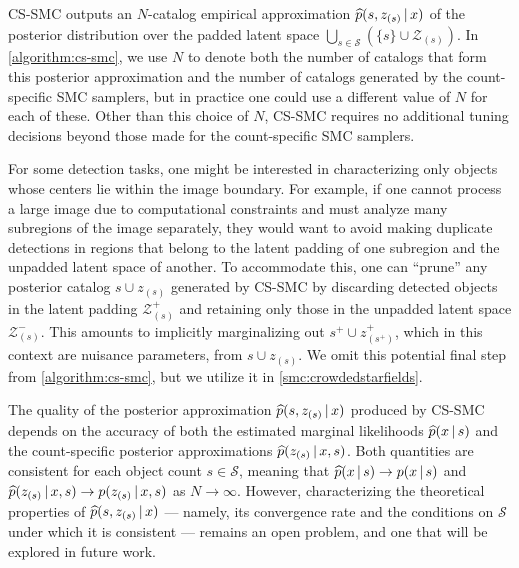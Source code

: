 \documentclass[
  12pt]{article}
\newcommand{\padvert}{\thinspace \vert \thinspace}
\begin{document}
CS-SMC outputs an $N$-catalog empirical approximation $\widehat{p}(s, z_{(s)} \padvert x)$ of the posterior distribution over the padded latent space $\bigcup_{s \in \mathcal{S}} (\{s\} \cup \mathcal{Z}_{(s)})$. In \autoref{algorithm:cs-smc}, we use $N$ to denote both the number of catalogs that form this posterior approximation and the number of catalogs generated by the count-specific SMC samplers, but in practice one could use a different value of $N$ for each of these. Other than this choice of $N$, CS-SMC requires no additional tuning decisions beyond those made for the count-specific SMC samplers.

For some detection tasks, one might be interested in characterizing only objects whose centers lie within the image boundary. For example, if one cannot process a large image due to computational constraints and must analyze many subregions of the image separately, they would want to avoid making duplicate detections in regions that belong to the latent padding of one subregion and the unpadded latent space of another. To accommodate this, one can ``prune'' any posterior catalog $s \cup z_{(s)}$ generated by CS-SMC by discarding detected objects in the latent padding $\mathcal{Z}_{(s)}^+$ and retaining only those in the unpadded latent space $\mathcal{Z}_{(s)}^-$. This amounts to implicitly marginalizing out $s^+ \cup z_{(s^+)}^+$, which in this context are nuisance parameters, from $s \cup z_{(s)}$. We omit this potential final step from \autoref{algorithm:cs-smc}, but we utilize it in \autoref{smc:crowdedstarfields}.

The quality of the posterior approximation $\widehat{p}(s, z_{(s)} \padvert x)$ produced by CS-SMC depends on the accuracy of both the estimated marginal likelihoods $\widehat{p}(x \padvert s)$ and the count-specific posterior approximations $\widehat{p}(z_{(s)} \padvert x, s)$. Both quantities are consistent for each object count $s \in \mathcal{S}$, meaning that $\widehat{p}(x \padvert s) \rightarrow p(x \padvert s)$ and $\widehat{p}(z_{(s)} \padvert x, s) \rightarrow p(z_{(s)} \padvert x, s)$ as $N \rightarrow \infty$. However, characterizing the theoretical properties of $\widehat{p}(s, z_{(s)} \padvert x)$ — namely, its convergence rate and the conditions on $\mathcal{S}$ under which it is consistent — remains an open problem, and one that will be explored in future work.



\end{document}
